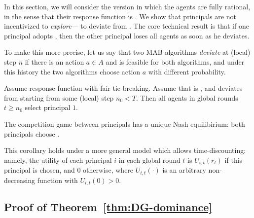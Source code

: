 
In this section, we will consider the version in which
the agents are fully rational, in the sense that their response function is \HardMax. We show that principals are not incentivized to \emph{explore}--- \ie to deviate from \DynGreedy. The core technical result is that if one principal adopts \DynGreedy, then the other principal loses all agents as soon as he deviates.

To make this more precise, let us say that two MAB algorithms \emph{deviate} at (local) step $n$ if there is an action $a\in A$ and  is feasible for both algorithms, and under this history the two algorithms choose action $a$ with different probability.

\iffalse
\begin{definition}
  Suppose that an algorithm $\pi$ is not dynamic greedy. Then
  {\em the first exploration} for $\pi$ is the first time step where
  there is a non-zero probability that the recommended action has a
  lower expectation than exploitation option.\sw{define...}
\end{definition}
\fi


\begin{theorem}\label{thm:DG-dominance}
Assume \HardMax response function with fair tie-breaking. Assume that \alg[1] is \DynGreedy, and \alg[2] deviates from \DynGreedy starting from some (local) step $n_0<T$. Then all agents in global rounds $t\geq n_0$ select principal $1$.
\end{theorem}

\begin{corollary}\label{cor:DG-dominance}
The competition game between principals has a unique Nash equilibirium: both principals choose \DynGreedy.
\end{corollary}


\begin{remark}
This corollary holds under a more general model which allows time-discounting: namely, the utility of each principal $i$ in each global round $t$ is $U_{i,t}(r_t)$ if this principal is chosen, and $0$ otherwise, where $U_{i,t}(\cdot)$ is an arbitrary non-decreasing function with $U_{i,t}(0)>0$.
\end{remark}

\subsection{Proof of Theorem~\ref{thm:DG-dominance}}

